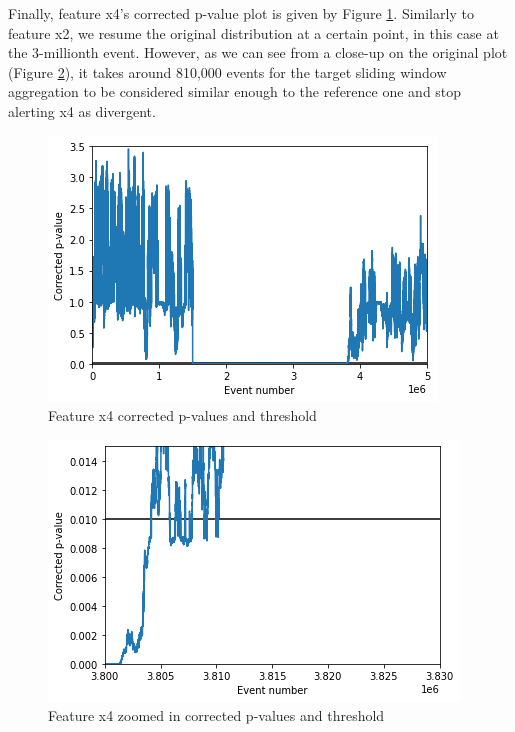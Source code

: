 Finally, feature x4's corrected p-value plot is given by Figure \ref{fig:x4-corrected-pvalues}. Similarly to feature x2, we resume the original distribution at a certain point, in this case at the 3-millionth event. However, as we can see from a close-up on the original plot (Figure \ref{fig:x4-corrected-pvalues-zoom}), it takes around 810,000 events for the target sliding window aggregation to be considered similar enough to the reference one and stop alerting x4 as divergent.
\begin{figure}[!htb]
    \begin{center}
      \includegraphics[scale=0.8]{figures/x4-corrected-pvalues.png}
      \caption{Feature x4 corrected p-values and threshold}
      \label{fig:x4-corrected-pvalues}
    \end{center}
\end{figure}
\begin{figure}[!htb]
    \begin{center}
      \includegraphics[scale=0.8]{figures/x4-corrected-pvalues-zoom2.png}
      \caption{Feature x4 zoomed in corrected p-values and threshold}
      \label{fig:x4-corrected-pvalues-zoom}
    \end{center}
\end{figure}


